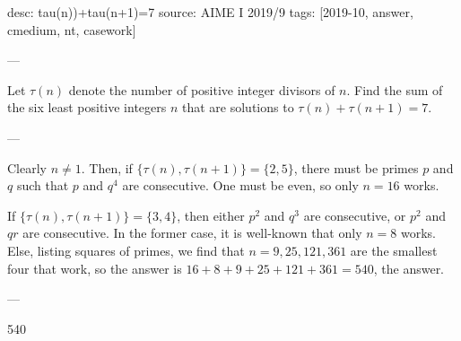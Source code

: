 desc: tau(n))+tau(n+1)=7
source: AIME I 2019/9
tags: [2019-10, answer, cmedium, nt, casework]

---

Let $\tau(n)$ denote the number of positive integer divisors of $n$. Find the sum of the six least positive integers $n$ that are solutions to $\tau(n)+\tau(n+1)=7$.

---

Clearly $n\ne 1$. Then, if $\{\tau(n),\tau(n+1)\}=\{2,5\}$, there must be primes $p$ and $q$ such that $p$ and $q^4$ are consecutive. One must be even, so only $n=16$ works.

If $\{\tau(n),\tau(n+1)\}=\{3,4\}$, then either $p^2$ and $q^3$ are consecutive, or $p^2$ and $qr$ are consecutive. In the former case, it is well-known that only $n=8$ works. Else, listing squares of primes, we find that $n=9,25,121,361$ are the smallest four that work, so the answer is $16+8+9+25+121+361=540$, the answer.

---

540
